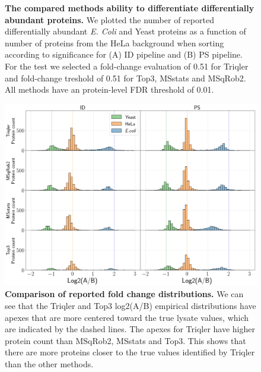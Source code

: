 \documentclass[11pt]{article}
\begin{document}
\begin{figure}[hbt]
\begin{tabular}{lclc}
    \end{tabular}
    \caption{{\bf The compared methods ability to differentiate differentially abundant proteins.} We plotted the number of reported differentially abundant  {\em E. Coli} and Yeast proteins as a function of number of proteins from the HeLa background when sorting according to significance for (A) ID pipeline and (B) PS pipeline. For the test we selected a fold-change evaluation of 0.51 for Triqler and fold-change treshold of 0.51 for Top3, MSstats and MSqRob2. All methods have an protein-level FDR threshold of 0.01. \label{fig:ability_to_differentiate_differentially_abundant_specie_vs_hela}}
\end{figure}


\begin{figure}[hbt]
    \centering
    \setlength{\tabcolsep}{0pt}

    \includegraphics[width=\linewidth]{../../result/report_plots/gridplot_histogram.png} 


    \caption{{\bf Comparison of reported fold change distributions.} We can see that the Triqler and Top3 log2(A/B) empirical distributions have apexes that are more centered toward the true lysate values, which are indicated by the dashed lines. The apexes for Triqler have higher protein count than MSqRob2, MSstats and Top3. This shows that there are more proteins closer to the true values identified by Triqler than the other methods. \label{fig:fc_histogram_supplement}}
    
\end{figure}
\end{document}
